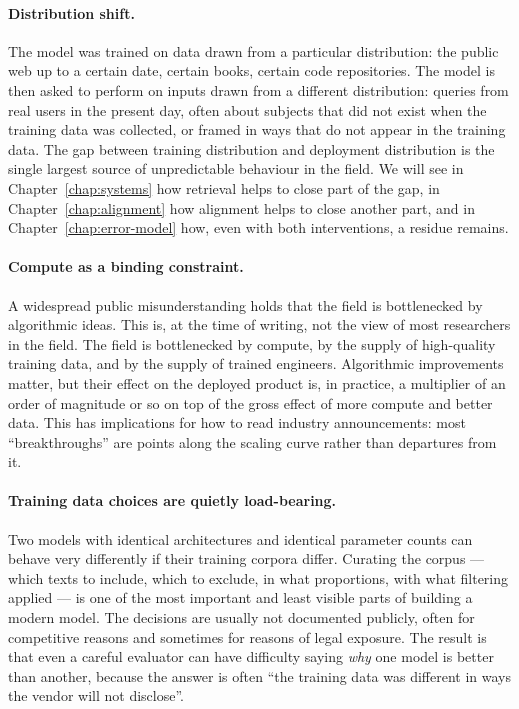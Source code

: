 \paragraph{Distribution shift.} The model was trained on data
drawn from a particular distribution: the public web up to a
certain date, certain books, certain code repositories. The
model is then asked to perform on inputs drawn from a different
distribution: queries from real users in the present day, often
about subjects that did not exist when the training data was
collected, or framed in ways that do not appear in the training
data. The gap between training distribution and deployment
distribution is the single largest source of unpredictable
behaviour in the field. We will see in Chapter~\ref{chap:systems} how retrieval
helps to close part of the gap, in Chapter~\ref{chap:alignment} how alignment
helps to close another part, and in Chapter~\ref{chap:error-model} how, even with
both interventions, a residue remains.

\paragraph{Compute as a binding constraint.} A widespread
public misunderstanding holds that the field is bottlenecked by
algorithmic ideas. This is, at the time of writing, not the
view of most researchers in the field. The field is bottlenecked
by compute, by the supply of high-quality training data, and by
the supply of trained engineers. Algorithmic improvements
matter, but their effect on the deployed product is, in
practice, a multiplier of an order of magnitude or so on top of
the gross effect of more compute and better data. This has
implications for how to read industry announcements: most
``breakthroughs'' are points along the scaling curve rather
than departures from it.

\paragraph{Training data choices are quietly load-bearing.}
Two models with identical architectures and identical
parameter counts can behave very differently if their training
corpora differ. Curating the corpus --- which texts to include,
which to exclude, in what proportions, with what filtering
applied --- is one of the most important and least visible
parts of building a modern model. The decisions are usually
not documented publicly, often for competitive reasons and
sometimes for reasons of legal exposure. The result is that
even a careful evaluator can have difficulty saying \emph{why}
one model is better than another, because the answer is often
``the training data was different in ways the vendor will not
disclose''.

